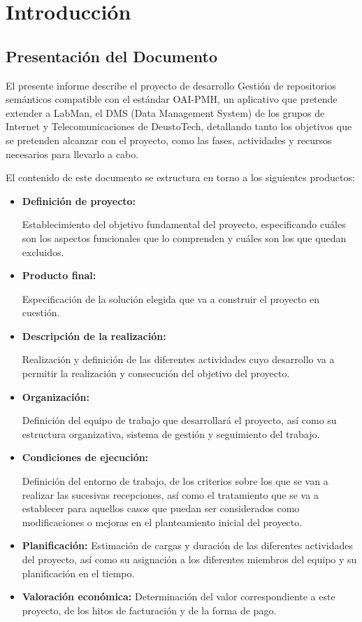 \chapter{Introducción}\label{cha:introduccion}

\section{Presentación del Documento}

El presente informe describe el proyecto de desarrollo Gestión de repositorios semánticos compatible con el estándar OAI-PMH, un aplicativo que pretende extender a LabMan, el DMS (Data Management System) de los grupos de Internet y Telecomunicaciones de DeustoTech, detallando tanto los objetivos que se pretenden alcanzar con el proyecto, como las fases, actividades y recursos necesarios para llevarlo a cabo.

El contenido de este documento se estructura en torno a los siguientes productos:

\begin{itemize}
	\item \textbf{Definición de proyecto:}
		
	Establecimiento del objetivo fundamental del proyecto, especificando cuáles son los aspectos funcionales que lo comprenden y cuáles son los que quedan excluidos.
	
	\item \textbf{Producto final:}
		
	Especificación de la solución elegida que va a construir el proyecto en cuestión.
	
	\item \textbf{Descripción de la realización:}

	Realización y definición de las diferentes actividades cuyo desarrollo va a permitir la realización y consecución del objetivo del proyecto.

	\item \textbf{Organización:}
	
	Definición del equipo de trabajo que desarrollará el proyecto, así como su estructura organizativa, sistema de gestión y seguimiento del trabajo.

	\item \textbf{Condiciones de ejecución:}

	Definición del entorno de trabajo, de los criterios sobre los que se van a realizar las sucesivas recepciones, así como el tratamiento que se va a establecer para aquellos casos que puedan ser considerados como modificaciones o mejoras en el planteamiento inicial del proyecto.

	\item \textbf{Planificación:}
	Estimación de cargas y duración de las diferentes actividades del proyecto, así como su asignación a los diferentes miembros del equipo y su planificación en el tiempo.

	\item \textbf{Valoración económica:}
	Determinación del valor correspondiente a este proyecto, de los hitos de facturación y de la forma de pago.
\end{itemize}

